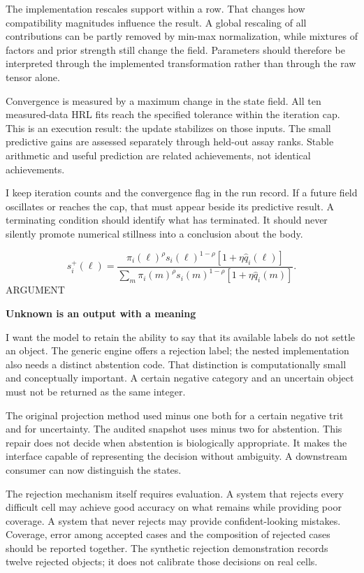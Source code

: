 \documentclass[10pt]{article}
\begin{document}
The implementation rescales support within a row. That changes how compatibility magnitudes influence the result. A global rescaling of all contributions can be partly removed by min-max normalization, while mixtures of factors and prior strength still change the field. Parameters should therefore be interpreted through the implemented transformation rather than through the raw tensor alone.\par
Convergence is measured by a maximum change in the state field. All ten measured-data HRL fits reach the specified tolerance within the iteration cap. This is an execution result: the update stabilizes on those inputs. The small predictive gains are assessed separately through held-out assay ranks. Stable arithmetic and useful prediction are related achievements, not identical achievements.\par
I keep iteration counts and the convergence flag in the run record. If a future field oscillates or reaches the cap, that must appear beside its predictive result. A terminating condition should identify what has terminated. It should never silently promote numerical stillness into a conclusion about the body.\par
\[s_i^{+}(\ell)=\frac{\pi_i(\ell)^\rho s_i(\ell)^{1-\rho}[1+\eta\widehat q_i(\ell)]}{\sum_m\pi_i(m)^\rho s_i(m)^{1-\rho}[1+\eta\widehat q_i(m)]}.\]
\clearpage
\hypertarget{p10}{}
{\small\color{accent}\MakeUppercase{Argument}}\par
{\LARGE\bfseries\color{ink}Unknown is an output with a meaning}\par\vspace{5pt}
I want the model to retain the ability to say that its available labels do not settle an object. The generic engine offers a rejection label; the nested implementation also needs a distinct abstention code. That distinction is computationally small and conceptually important. A certain negative category and an uncertain object must not be returned as the same integer.\par
The original projection method used minus one both for a certain negative trit and for uncertainty. The audited snapshot uses minus two for abstention. This repair does not decide when abstention is biologically appropriate. It makes the interface capable of representing the decision without ambiguity. A downstream consumer can now distinguish the states.\par
The rejection mechanism itself requires evaluation. A system that rejects every difficult cell may achieve good accuracy on what remains while providing poor coverage. A system that never rejects may provide confident-looking mistakes. Coverage, error among accepted cases and the composition of rejected cases should be reported together. The synthetic rejection demonstration records twelve rejected objects; it does not calibrate those decisions on real cells.\par
\end{document}
